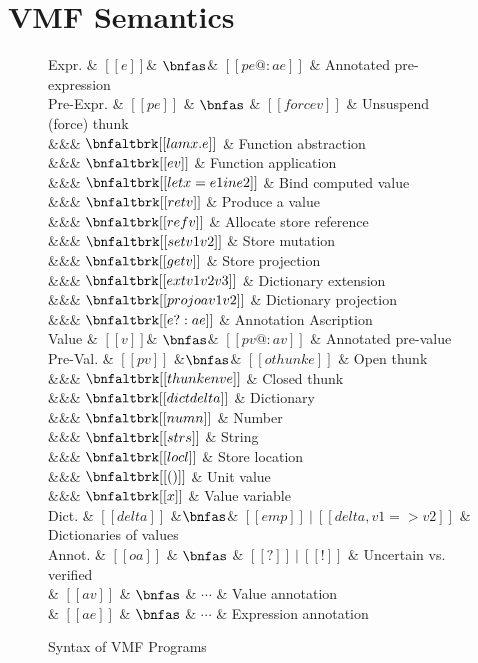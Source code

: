 \section{VMF Semantics}

\begin{figure}
\begin{grammar}
  Expr.     & $[[e]]$& $\bnfas$& $[[pe @: ae]]$ & Annotated pre-expression
  \\
  Pre-Expr. & $[[pe]]$ & $\bnfas$ & $[[force v]]$ & Unsuspend (force) thunk
  \\ &&& $\bnfaltbrk [[lam x. e]]$ & Function abstraction
  \\ &&& $\bnfaltbrk [[ e v ]]$ & Function application
  \\ &&& $\bnfaltbrk [[let x = e1 in e2]]$ & Bind computed value
  \\ &&& $\bnfaltbrk [[ret v]]$ & Produce a value
  \\ &&& $\bnfaltbrk [[ref v]]$ & Allocate store reference
  \\ &&& $\bnfaltbrk [[set v1 v2]]$ & Store mutation
  \\ &&& $\bnfaltbrk [[get v]]$ & Store projection
  \\ &&& $\bnfaltbrk [[ext v1 v2 v3]]$ & Dictionary extension
  \\ &&& $\bnfaltbrk [[proj oa v1 v2]]$ & Dictionary projection
  \\ &&& $\bnfaltbrk [[e ?: ae]]$ & Annotation Ascription
  \\[2px]
  Value    & $[[v]]$& $\bnfas$& $[[pv @: av]]$ & Annotated pre-value
  \\
  Pre-Val. & $[[pv]]$ 
  &$\bnfas$&        $[[othunk e]]$    & Open thunk
  \\ &&& $\bnfaltbrk [[thunk env e]]$ & Closed thunk
  \\ &&& $\bnfaltbrk [[dict delta]]$  & Dictionary
  \\ &&& $\bnfaltbrk [[num n]]$ & Number
  \\ &&& $\bnfaltbrk [[str s]]$ & String
  \\ &&& $\bnfaltbrk [[loc l]]$ & Store location
  \\ &&& $\bnfaltbrk [[()]]$    & Unit value
  \\ &&& $\bnfaltbrk [[x]]$     & Value variable
  \\
  Dict. & $[[ delta ]]$
  &$\bnfas$& $[[ emp ]]~|~[[ delta , v1 => v2 ]]$ & Dictionaries of values
  \\[2mm]
  Annot.
    & $[[oa]]$ & $\bnfas$ & $[[ ? ]]~|~[[ ! ]]$ & Uncertain vs. verified
  \\
    & $[[av]]$ & $\bnfas$ & $\cdots$ & Value annotation
  \\
    & $[[ae]]$ & $\bnfas$ & $\cdots$ & Expression annotation

\end{grammar}
\caption{Syntax of VMF Programs}
\label{fig-syntax}
\end{figure}

